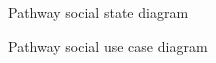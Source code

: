 ﻿\documentclass{article}
\begin{document}
\begin{figure}[H]
    \centering
    \begin{center}
    \end{center}
    \caption{Pathway social state diagram}
    \label{fig:my_label}
\end{figure}

\begin{figure}[H]
    \centering
    \begin{center}
    \end{center}
    \caption{Pathway social use case diagram}
    \label{fig:my_label}
\end{figure}
\end{document}
